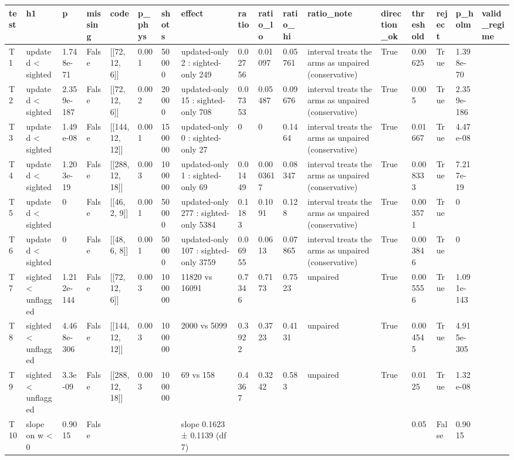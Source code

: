 \begin{tabular}{lllllllllllllllll}
\hline
test & h1 & p & missing & code & p\_phys & shots & effect & ratio & ratio\_lo & ratio\_hi & ratio\_note & direction\_ok & threshold & reject & p\_holm & valid\_regime \\
\hline
T1 & updated < sighted & 1.748e-71 & False & [[72, 12, 6]] & 0.001 & 50000 & updated-only 2 : sighted-only 249 & 0.02756 & 0.01097 & 0.05761 & interval treats the arms as unpaired (conservative) & True & 0.00625 & True & 1.398e-70 &  \\
T2 & updated < sighted & 2.359e-187 & False & [[72, 12, 6]] & 0.002 & 20000 & updated-only 15 : sighted-only 708 & 0.07353 & 0.05487 & 0.09676 & interval treats the arms as unpaired (conservative) & True & 0.005 & True & 2.359e-186 &  \\
T3 & updated < sighted & 1.49e-08 & False & [[144, 12, 12]] & 0.001 & 150000 & updated-only 0 : sighted-only 27 & 0 & 0 & 0.1464 & interval treats the arms as unpaired (conservative) & True & 0.01667 & True & 4.47e-08 &  \\
T4 & updated < sighted & 1.203e-19 & False & [[288, 12, 18]] & 0.003 & 100000 & updated-only 1 : sighted-only 69 & 0.01449 & 0.0003617 & 0.08347 & interval treats the arms as unpaired (conservative) & True & 0.008333 & True & 7.217e-19 &  \\
T5 & updated < sighted & 0 & False & [[46, 2, 9]] & 0.001 & 50000 & updated-only 277 : sighted-only 5384 & 0.1183 & 0.1091 & 0.128 & interval treats the arms as unpaired (conservative) & True & 0.003571 & True & 0 &  \\
T6 & updated < sighted & 0 & False & [[48, 6, 8]] & 0.001 & 50000 & updated-only 107 : sighted-only 3759 & 0.06955 & 0.0613 & 0.07865 & interval treats the arms as unpaired (conservative) & True & 0.003846 & True & 0 &  \\
T7 & sighted < unflagged & 1.212e-144 & False & [[72, 12, 6]] & 0.003 & 100000 & 11820 vs 16091 & 0.7346 & 0.7173 & 0.7523 & unpaired & True & 0.005556 & True & 1.091e-143 &  \\
T8 & sighted < unflagged & 4.468e-306 & False & [[144, 12, 12]] & 0.003 & 100000 & 2000 vs 5099 & 0.3922 & 0.3723 & 0.4131 & unpaired & True & 0.004545 & True & 4.915e-305 &  \\
T9 & sighted < unflagged & 3.3e-09 & False & [[288, 12, 18]] & 0.003 & 100000 & 69 vs 158 & 0.4367 & 0.3242 & 0.583 & unpaired & True & 0.0125 & True & 1.32e-08 &  \\
T10 & slope on w < 0 & 0.9015 & False &  &  &  & slope 0.1623 ± 0.1139 (df 7) &  &  &  &  &  & 0.05 & False & 0.9015 &  \\

\end{tabular}
